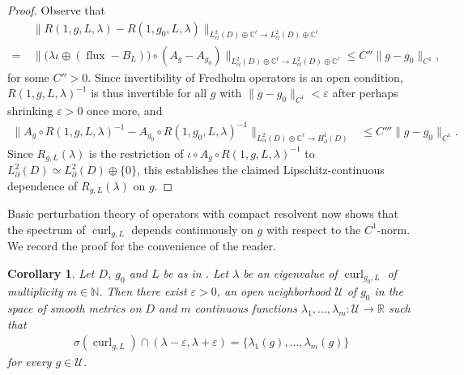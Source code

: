 \documentclass[11pt,reqno]{amsart}
\newtheorem{corollary}{Corollary}[section]
\DeclareMathOperator{\curl}{curl}
\DeclareMathOperator{\flux}{flux}
\begin{document}
\begin{proof}
    Observe that
    \begin{align*}
        &\|R(1,g,L,\lambda) - R(1,g_0,L,\lambda)\|_{L^2_{cl}(D)\oplus \mathbb C^\ell \to L^2_{cl}(D)\oplus \mathbb C^\ell} \\ = \ &\| \big( \lambda \iota \oplus (\flux - B_L) \big) \circ (A_g - A_{g_0})\|_{L^2_{cl}(D)\oplus \mathbb C^\ell \to L^2_{cl}(D)\oplus \mathbb C^\ell} \leq C'' \| g - g_0 \|_{C^1},
    \end{align*}
    for some $C'' > 0$. Since invertibility of Fredholm operators is an open condition, $R(1,g,L,\lambda)^{-1}$ is thus invertible for all $g$ with $\|g-g_0\|_{C^1} < \varepsilon$ after perhaps shrinking $\varepsilon > 0$ once more, and
    \begin{align*}
        \| A_g \circ R(1,g,L,\lambda)^{-1} - A_{g_0} \circ R(1,g_0,L,\lambda)^{-1} \|_{L^2_{cl}(D)\oplus \mathbb C^\ell \to H^1_\partial(D)} &\leq C''' \| g - g_0 \|_{C^1}.
    \end{align*}
    Since $R_{g,L}(\lambda)$ is the restriction of $\iota \circ A_g \circ R(1,g,L,\lambda)^{-1}$ to $L^2_{\partial}(D) \simeq L^2_{\partial}(D) \oplus \{0\}$, this establishes the claimed Lipschitz-continuous dependence of $R_{g,L}(\lambda)$ on $g$.
\end{proof}

Basic perturbation theory of operators with compact resolvent now shows that the spectrum of $\curl_{g,L}$ depends continuously on $g$ with respect to the $C^1$-norm. We record the proof for the convenience of the reader.

\begin{corollary}
    \label{cor:continuous_spectrum}
    Let $D$, $g_0$ and $L$ be as in . Let $\lambda$ be an eigenvalue of $\curl_{g_0,L}$ of multiplicity $m \in \mathbb N$. Then there exist $\varepsilon > 0$, an open neighborhood $\mathcal U$ of $g_0$ in the space of smooth metrics on $D$ and $m$ continuous functions $\lambda_1,\ldots,\lambda_m: \mathcal U \to \mathbb R$ such that 
    \begin{align*}
        \sigma(\curl_{g,L}) \cap (\lambda-\varepsilon,\lambda+\varepsilon) = \{\lambda_1(g),\ldots,\lambda_m(g)\}
    \end{align*}
    for every $g \in \mathcal U$.
\end{corollary}
\end{document}
